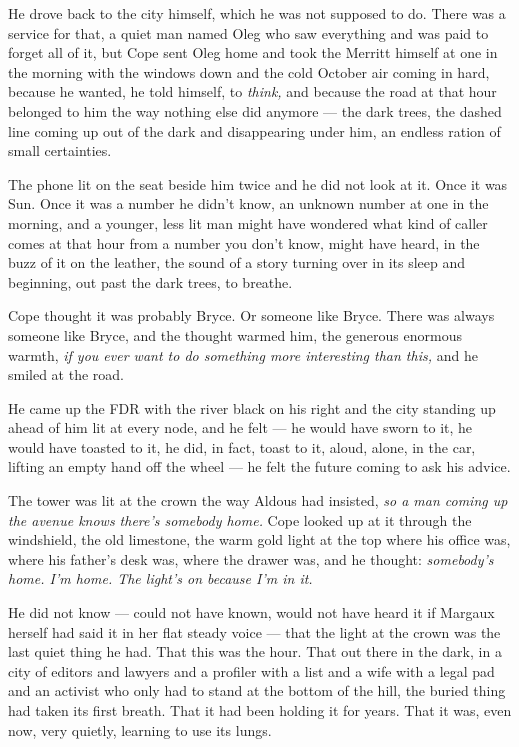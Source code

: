 \documentclass[11pt,openany]{book}
\newcommand{\scenebreak}{\par\vspace{0.5\baselineskip}\begin{center}\textasteriskcentered\quad\textasteriskcentered\quad\textasteriskcentered\end{center}\vspace{0.5\baselineskip}\par}
\begin{document}
\scenebreak


He drove back to the city himself, which he was not supposed to do. There was a service for that, a quiet man named Oleg who saw everything and was paid to forget all of it, but Cope sent Oleg home and took the Merritt himself at one in the morning with the windows down and the cold October air coming in hard, because he wanted, he told himself, to \textit{think,} and because the road at that hour belonged to him the way nothing else did anymore --- the dark trees, the dashed line coming up out of the dark and disappearing under him, an endless ration of small certainties.

The phone lit on the seat beside him twice and he did not look at it. Once it was Sun. Once it was a number he didn't know, an unknown number at one in the morning, and a younger, less lit man might have wondered what kind of caller comes at that hour from a number you don't know, might have heard, in the buzz of it on the leather, the sound of a story turning over in its sleep and beginning, out past the dark trees, to breathe.

Cope thought it was probably Bryce. Or someone like Bryce. There was always someone like Bryce, and the thought warmed him, the generous enormous warmth, \textit{if you ever want to do something more interesting than this,} and he smiled at the road.

He came up the FDR with the river black on his right and the city standing up ahead of him lit at every node, and he felt --- he would have sworn to it, he would have toasted to it, he did, in fact, toast to it, aloud, alone, in the car, lifting an empty hand off the wheel --- he felt the future coming to ask his advice.

The tower was lit at the crown the way Aldous had insisted, \textit{so a man coming up the avenue knows there's somebody home.} Cope looked up at it through the windshield, the old limestone, the warm gold light at the top where his office was, where his father's desk was, where the drawer was, and he thought: \textit{somebody's home. I'm home. The light's on because I'm in it.}

He did not know --- could not have known, would not have heard it if Margaux herself had said it in her flat steady voice --- that the light at the crown was the last quiet thing he had. That this was the hour. That out there in the dark, in a city of editors and lawyers and a profiler with a list and a wife with a legal pad and an activist who only had to stand at the bottom of the hill, the buried thing had taken its first breath. That it had been holding it for years. That it was, even now, very quietly, learning to use its lungs.
\end{document}
